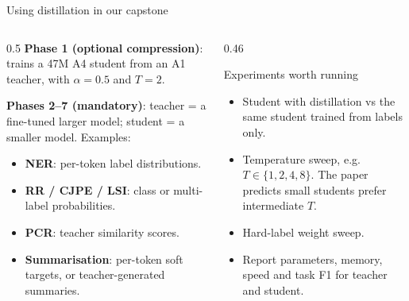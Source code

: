 \documentclass[aspectratio=169,11pt]{beamer}
\begin{document}
\begin{frame}{Using distillation in our capstone}
  \begin{columns}[T]
    \begin{column}{0.5\textwidth}
      \small
      \textbf{Phase 1 (optional compression)}:  trains a 47M A4 student from an A1 teacher, with $\alpha=0.5$ and $T=2$.
      \vspace{2mm}

      \textbf{Phases 2--7 (mandatory)}: teacher = a fine-tuned larger model; student = a smaller model. Examples:
      \begin{itemize}
        \item \textbf{NER}: per-token label distributions.
        \item \textbf{RR / CJPE / LSI}: class or multi-label probabilities.
        \item \textbf{PCR}: teacher similarity scores.
        \item \textbf{Summarisation}: per-token soft targets, or teacher-generated summaries.
      \end{itemize}
    \end{column}
    \begin{column}{0.46\textwidth}
      \begin{block}{Experiments worth running}
        \small
        \begin{itemize}
          \item Student with distillation vs the same student trained from labels only.
          \item Temperature sweep, e.g.\ $T\in\{1,2,4,8\}$. The paper predicts small students prefer intermediate $T$.
          \item Hard-label weight sweep.
          \item Report parameters, memory, speed and task F1 for teacher and student.
        \end{itemize}
      \end{block}
    \end{column}
  \end{columns}
\end{frame}
\end{document}
